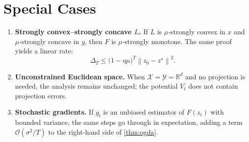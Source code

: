 \documentclass{article}
\newcommand{\norm}[1]{\left\lVert#1\right\rVert}
\newcommand{\R}{\mathbb{R}}
\begin{document}
\section*{Special Cases}
\begin{enumerate}[leftmargin=*,label=\arabic*.]
\item \textbf{Strongly convex–strongly concave $L$.}
If $L$ is $\mu$‑strongly convex in $x$ and $\mu$‑strongly concave in $y$, then
$F$ is $\mu$‑strongly monotone. The same proof yields a linear rate:
\[
\Delta_T\le\bigl(1-\eta\mu\bigr)^{T}\norm{z_0-z^\star}^{2}.
\]

\item \textbf{Unconstrained Euclidean space.}
When $\mathcal X=\mathcal Y=\R^{d}$ and no projection is needed, the analysis
remains unchanged; the potential $V_t$ does not contain projection errors.

\item \textbf{Stochastic gradients.}
If $g_t$ is an unbiased estimator of $F(z_t)$ with bounded variance,
the same steps go through in expectation, adding a term
$\mathcal O(\sigma^{2}/T)$ to the right‑hand side of \eqref{thm:ogda}.
\end{enumerate}
\end{document}
